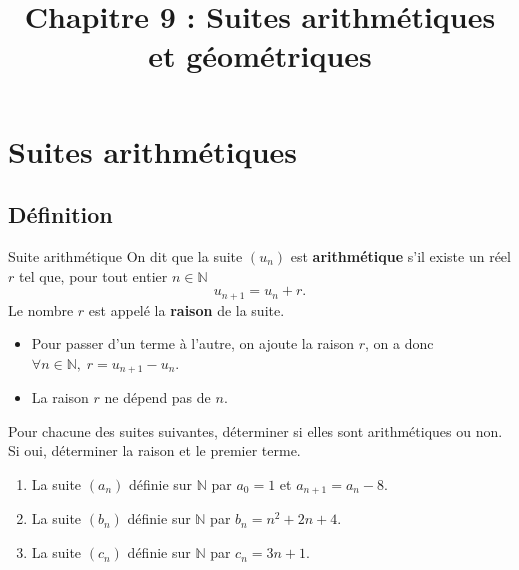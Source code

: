 \documentclass[11pt]{article}
\title{Chapitre 9 : Suites arithmétiques et géométriques}
\date{}
\author{}
\begin{document}
\maketitle\thispagestyle{fancy}

\section{Suites arithmétiques}
\subsection{Définition}
\begin{defi}{Suite arithmétique}
  On dit que la suite $(u_n)$ est \textbf{arithmétique} s'il existe un réel
  $r$ tel que, pour tout entier $n\in\mathbb{N}$
  \[
    u_{n+1} = u_n + r.
  \]
  Le nombre $r$ est appelé la \textbf{raison} de la suite.

  \begin{center}
  \end{center}
\end{defi}

\begin{rmq}
  \begin{itemize}
    \item Pour passer d'un terme à l'autre, on ajoute la raison $r$, on a donc
      $\forall n\in\mathbb{N},\;r=u_{n+1}-u_n$.
    \item La raison $r$ ne dépend pas de $n$.
  \end{itemize}
\end{rmq}

\begin{app}
  Pour chacune des suites suivantes, déterminer si elles sont arithmétiques ou
  non. Si oui, déterminer la raison et le premier terme.
  \begin{enumerate}
    \item La suite $(a_n)$ définie sur $\mathbb{N}$ par $a_0=1$ et
      $a_{n+1}=a_n-8$.
    \item La suite $(b_n)$ définie sur $\mathbb{N}$ par $b_n=n^2+2n+4$.
    \item La suite $(c_n)$ définie sur $\mathbb{N}$ par $c_n=3n+1$.
  \end{enumerate}
\end{app}
\end{document}
